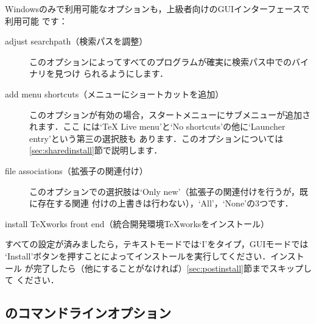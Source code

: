 \documentclass[uplatex,dvipdfmx,tombow]{jsarticle}
\begin{document}
Windowsのみで利用可能なオプションも，上級者向けのGUIインターフェースで利用可能
です：
%
\begin{description}
\item[adjust searchpath（検索パスを調整）]
このオプションによってすべてのプログラムが確実に検索パス中で\TL のバイナリを見つけ
られるようにします．

\item[add menu shortcuts（メニューにショートカットを追加）]
このオプションが有効の場合，スタートメニューに\TL サブメニューが追加されます．ここ
には`TeX Live menu'と`No shortcuts'の他に`Launcher entry'という第三の選択肢も
あります．このオプションについては\ref{sec:sharedinstall}節で説明します．

\item[file associations（拡張子の関連付け）]
このオプションでの選択肢は`Only new'（拡張子の関連付けを行うが，既に存在する関連
付けの上書きは行わない），`All'，`None'の3つです．

\item[install \TeX works front end（統合開発環境\TeX worksをインストール）]
\end{description}

すべての設定が済みましたら，テキストモードでは`I'をタイプ，GUIモードでは
`Install'ボタンを押すことによってインストールを実行してください．インストール
が完了したら（他にすることがなければ）\ref{sec:postinstall}節までスキップして
ください．

\subsection{のコマンドラインオプション}
\label{sec:cmdline}
\end{document}
